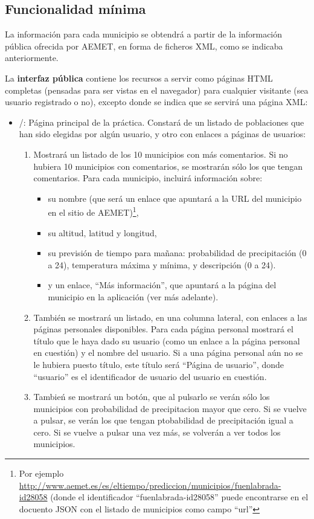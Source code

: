 \subsection{Funcionalidad mínima}

La información para cada municipio se obtendrá a partir de la información pública ofrecida por AEMET, en forma de ficheros XML, como se indicaba anteriormente.

La {\bf interfaz pública} contiene los recursos a servir como páginas HTML completas (pensadas para ser vistas en el navegador) para cualquier visitante (sea usuario registrado o no), excepto donde se indica que se servirá una página XML:

\begin{itemize}
  \item /: Página principal de la práctica. Constará de un listado de poblaciones que han sido elegidas por algún usuario, y otro con enlaces a páginas de usuarios:
  
  \begin{enumerate}
    \item Mostrará un listado de los 10 municipios con más comentarios. Si no hubiera 10 municipios con comentarios, se mostrarán sólo los que tengan comentarios. Para cada municipio, incluirá información sobre:
    \begin{itemize}
    \item su nombre (que será un enlace que apuntará a la URL del municipio en el sitio de AEMET)\footnote{Por ejemplo \url{http://www.aemet.es/es/eltiempo/prediccion/municipios/fuenlabrada-id28058} (donde el identificador ``fuenlabrada-id28058'' puede encontrarse en el docuento JSON con el listado de municipios como campo ``url''}, 
    \item su altitud, latitud y longitud,
    \item su previsión de tiempo para mañana: probabilidad de precipitación (0 a 24), temperatura máxima y mínima, y descripción (0 a 24).
    \item y un enlace, ``Más información'', que apuntará a la página del municipio en la aplicación (ver más adelante).
    \end{itemize}
   
  \item También se mostrará un listado, en una columna lateral, con enlaces a las páginas personales disponibles. Para cada página personal mostrará el título que le haya dado su usuario (como un enlace a la página personal en cuestión) y el nombre del usuario. Si a una página personal aún no se le hubiera puesto título, este título será ``Página de usuario'', donde ``usuario'' es el identificador de usuario del usuario en cuestión.
  \item Tambień se mostrará un botón, que al pulsarlo se verán sólo los municipios con probabilidad de precipitacion mayor que cero. Si se vuelve a pulsar, se verán los que tengan ptobabilidad de precipitación igual a cero. Si se vuelve a pulsar una vez más, se volverán a ver todos los municipios.
   \end{enumerate}


\end{itemize}
